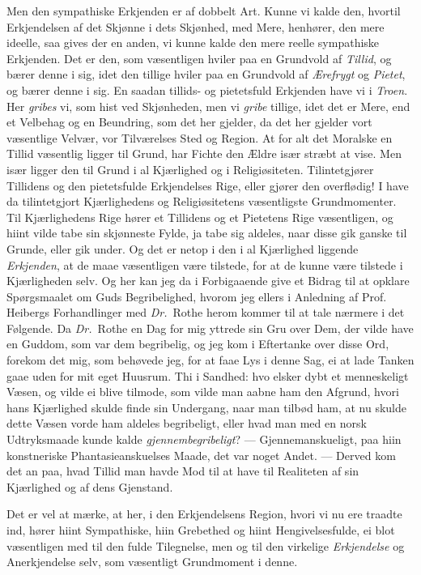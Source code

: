 \documentclass[12pt,a4paper]{book}
\newcommand{\apage}[1]{\marginnote{\footnotesize\textit{[#1]}}}
\begin{document}
Men den sympathiske Erkjenden er af dobbelt Art. Kunne vi kalde den, hvortil
Erkjendelsen af det Skjønne i dets Skjønhed, med Mere, henhører, den mere
ideelle, saa gives der en anden, vi kunne kalde den mere reelle sympathiske
Erkjenden. Det er den, som væsentligen hviler paa en Grundvold af \emph{Tillid}, og
bærer denne i sig, idet den tillige hviler paa en Grundvold af \emph{Ærefrygt} og
\emph{Pietet}, og bærer denne i sig. En saadan tillids- og pietetsfuld Erkjenden
have vi i \emph{Troen}. Her \emph{gribes} vi, som hist ved Skjønheden, men vi \emph{gribe} tillige,
idet det er Mere, end et Velbehag og en Beundring, som det her gjelder, da det
her gjelder vort væsentlige Velvær, vor Tilværelses Sted og Region. At for alt
det Moralske en Tillid væsentlig ligger til Grund, har Fichte den Ældre især
stræbt at vise. Men især ligger den til Grund i al Kjærlighed og i
Religiøsiteten. Tilintetgjører Tillidens og den pietetsfulde Erkjendelses
Rige, eller gjører den overflødig! I have da tilintetgjort Kjærlighedens og
Religiøsitetens væsentligste Grundmomenter. Til Kjærlighedens Rige hører et
Tillidens og et Pietetens Rige væsentligen, og hiint vilde tabe sin skjønneste
Fylde, ja tabe sig aldeles, naar disse gik ganske til Grunde, eller gik under.
Og det er netop i den i al Kjærlighed liggende \emph{Erkjenden}, at de maae
væsentligen være tilstede, for at de kunne være tilstede i Kjærligheden selv.
Og her kan jeg da i Forbigaaende give et Bidrag til at opklare Spørgsmaalet om
Guds Begribelighed, hvorom jeg ellers i Anledning af Prof. Heibergs
Forhandlinger med \textit{Dr.}\ Rothe herom kommer til at tale nærmere i det Følgende.
Da \textit{Dr.}\ Rothe en Dag for mig yttrede sin Gru over Dem, der vilde have en
Guddom, som var dem begribelig, og jeg kom i Eftertanke over disse Ord,
forekom det mig, som behøvede jeg, for at faae Lys i denne Sag, ei at lade
Tanken gaae uden for mit eget Huusrum. Thi i \apage{110} Sandhed: hvo elsker dybt et
menneskeligt Væsen, og vilde ei blive tilmode, som vilde man aabne ham den
Afgrund, hvori hans Kjærlighed skulde finde sin Undergang, naar man tilbød
ham, at nu skulde dette Væsen vorde ham aldeles begribeligt, eller hvad man
med en norsk Udtryksmaade kunde kalde \emph{gjennembegribeligt}? ---
Gjennemanskueligt, paa hiin konstneriske Phantasieanskuelses Maade, det var
noget Andet. --- Derved kom det an paa, hvad Tillid man havde Mod til at have
til Realiteten af sin Kjærlighed og af dens Gjenstand.

Det er vel at mærke, at her, i den Erkjendelsens Region, hvori vi nu ere
traadte ind, hører hiint Sympathiske, hiin Grebethed og hiint Hengivelsesfulde,
ei blot væsentligen med til den fulde Tilegnelse, men og til den virkelige
\emph{Erkjendelse} og Anerkjendelse selv, som væsentligt Grundmoment i denne.
\end{document}
